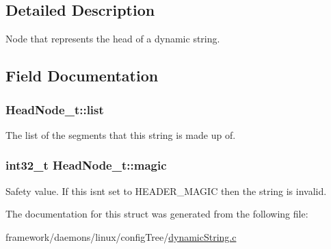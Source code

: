 \subsection{Detailed Description}
Node that represents the head of a dynamic string. 

\subsection{Field Documentation}
\subsubsection[{\texorpdfstring{list}{list}}]{ Head\+Node\+\_\+t\+::list}\hypertarget{struct_head_node__t_a93a2c8ba2626a4bd5e6f41b5010a7839}{}\label{struct_head_node__t_a93a2c8ba2626a4bd5e6f41b5010a7839}


The list of the segments that this string is made up of. 

\subsubsection[{\texorpdfstring{magic}{magic}}]{\setlength{\rightskip}{0pt plus 5cm}int32\+\_\+t Head\+Node\+\_\+t\+::magic}\hypertarget{struct_head_node__t_a6a65dec1ea5d772b10a28fc5e082a61f}{}\label{struct_head_node__t_a6a65dec1ea5d772b10a28fc5e082a61f}
Safety value. If this isn\textquotesingle{}t set to H\+E\+A\+D\+E\+R\+\_\+\+M\+A\+G\+IC then the string is invalid. 

The documentation for this struct was generated from the following file\+:\begin{DoxyCompactItemize}
\item 
framework/daemons/linux/config\+Tree/\hyperlink{dynamic_string_8c}{dynamic\+String.\+c}\end{DoxyCompactItemize}
